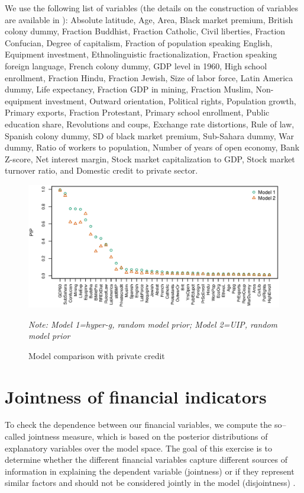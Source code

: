 \begin{refsection}
\begin{subappendices}
We use the following list of variables (the details on the construction of variables are available in \textcite{Fernandezetal2001}): Absolute latitude, Age, Area, Black market premium, British colony dummy, Fraction Buddhist, Fraction Catholic, Civil liberties, Fraction Confucian, Degree of capitalism, Fraction of population speaking English, Equipment investment, Ethnolinguistic fractionalization, Fraction speaking foreign language, French colony dummy, GDP level in 1960, High school enrollment, Fraction Hindu, Fraction Jewish, Size of labor force, Latin America dummy, Life expectancy, Fraction GDP in mining, Fraction Muslim, Non-equipment investment, Outward orientation, Political rights, Population growth, Primary exports, Fraction Protestant, Primary school enrollment, Public education share, Revolutions and coups, Exchange rate distortions, Rule of law, Spanish colony dummy, SD of black market premium, Sub-Sahara dummy, War dummy, Ratio of workers to population, Number of years of open economy, Bank Z-score, Net interest margin, Stock market capitalization to GDP, Stock market turnover ratio, and Domestic credit to private sector.

\begin{figure}[!ht]
	\centering
		\caption{Model comparison with private credit}
		\label{ch2fig:compPCrnd}
		\includegraphics[width=\linewidth]{Figures/ch2/plotCompPC6011rnd}
		\begin{minipage}{0.8\textwidth}
			\footnotesize
			\emph{Note: Model 1=hyper-g, random model prior; Model 2=\ac{UIP}, random model prior}
		  \end{minipage}
\end{figure}
%

\section{Jointness of financial indicators}\label{ch2app:joint}
To check the dependence between our financial variables, we compute the so--called jointness measure, which is based on the posterior distributions of explanatory variables over the model space. The goal of this exercise is to determine whether the different financial variables capture different sources of information in explaining the dependent variable (jointness) or if they represent similar factors and should not be considered jointly in the model (disjointness) \parencite{leysteel2007}.


\end{subappendices}
\end{refsection}
